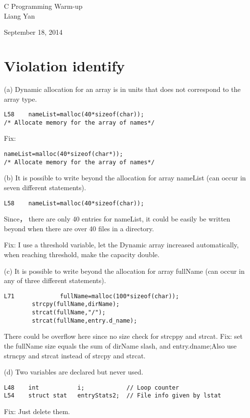 \documentclass[12pt]{article}
\begin{document}
\begin{center}
{\large C Programming Warm-up}\\

{\small Liang Yan\\}

{\small September 18, 2014\\}

\end{center}

\section{Violation identify}

(a) Dynamic allocation for an array is in units that does not
correspond to the array type. 
\begin{lstlisting}
L58    nameList=malloc(40*sizeof(char));
/* Allocate memory for the array of names*/ 
\end{lstlisting}
Fix:
\begin{lstlisting}
nameList=malloc(40*sizeof(char*));  
/* Allocate memory for the array of names*/ 
\end{lstlisting}

(b) It is possible to write beyond the allocation for array nameList
(can occur in seven different statements).
\begin{lstlisting}
L58    nameList=malloc(40*sizeof(char));
\end{lstlisting}
Since， there are only 40 entries for nameList,
it could be easily be written beyond when there are over 40 files in a
directory.


Fix: I use a threshold variable, let the Dynamic array increased
automatically, when reaching threshold, make the capacity double.


(c) It is possible to write beyond the allocation for array fullName
(can occur in any of three different statements).
\begin{lstlisting}
L71             fullName=malloc(100*sizeof(char));
        strcpy(fullName,dirName);
        strcat(fullName,"/");
        strcat(fullName,entry.d_name);
\end{lstlisting}
There could be overflow here since no size check for strcppy and
strcat.
Fix:
set the fullName size equals the sum of dirName slash, and
entry.dname;Also use strncpy and strcat instead of strcpy and
strcat. 


(d) Two variables are declared but never used. 
\begin{lstlisting}
L48    int           i;            // Loop counter 
L54    struct stat   entryStats2;  // File info given by lstat 
\end{lstlisting}
Fix: Just delete them.
\end{document}
